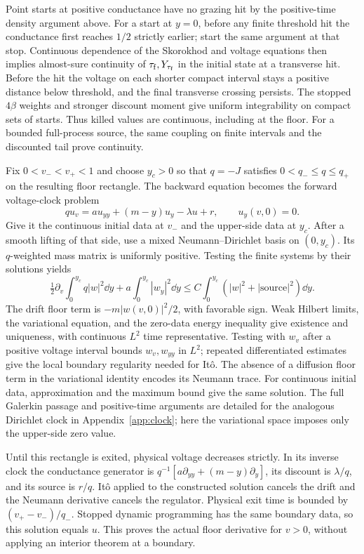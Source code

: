 Point starts at positive conductance have no grazing hit by the
positive-time density argument above. For a start at $y=0$,
before any finite threshold hit the conductance first reaches
$1/2$ strictly earlier; start the same argument at that stop.
Continuous dependence of the Skorokhod and voltage equations
then implies almost-sure continuity of ${\tau_{\mathrm f}},Y_{\tau_{\mathrm f}}$ in the
initial state at a transverse hit. Before the hit the voltage
on each shorter compact interval stays a positive distance
below threshold, and the final transverse crossing persists.
The stopped $4\beta$ weights and stronger discount moment give
uniform integrability on compact sets of starts. Thus killed
values are continuous, including at the floor. For a bounded
full-process source, the same coupling on finite intervals
and the discounted tail prove continuity.

Fix $0<v_-<v_+<1$ and choose $y_c>0$ so that $q=-J$ satisfies
$0<q_-\le q\le q_+$ on the resulting floor rectangle.
The backward equation becomes the forward voltage-clock problem
\begin{equation}\label{eq:floor-clock}
 q u_v=au_{yy}+(m-y)u_y-\lambda u+r,\qquad
 u_y(v,0)=0 .
\end{equation}
Give it the continuous initial data at $v_-$ and the upper-side
data at $y_c$. After a smooth lifting of that side, use a mixed
Neumann--Dirichlet basis on $(0,y_c)$. Its $q$-weighted mass
matrix is uniformly positive. Testing the finite systems by
their solutions yields
\[
 \tfrac12\partial_v\int_0^{y_c}q|w|^2\dd y
        +a\int_0^{y_c}|w_y|^2\dd y
 \le C\int_0^{y_c}(|w|^2+|\text{source}|^2)\dd y .
\]
The drift floor term is $-m|w(v,0)|^2/2$, with favorable sign.
Weak Hilbert limits, the variational equation, and the
zero-data energy inequality give existence and uniqueness,
with continuous $L^2$ time representative. Testing with $w_v$
after a positive voltage interval bounds $w_v,w_{yy}$ in $L^2$;
repeated differentiated estimates give the local boundary
regularity needed for It\^o. The absence of a diffusion floor
term in the variational identity encodes its Neumann trace.
For continuous initial data, approximation and the maximum
bound give the same solution. The full Galerkin passage and
positive-time arguments are detailed for the analogous
Dirichlet clock in Appendix~\ref{app:clock}; here the variational
space imposes only the upper-side zero value.

Until this rectangle is exited, physical voltage decreases
strictly. In its inverse clock the conductance generator is
$q^{-1}[a\partial_{yy}+(m-y)\partial_y]$, its discount is
$\lambda/q$, and its source is $r/q$. It\^o applied to the
constructed solution cancels the drift and the Neumann
derivative cancels the regulator. Physical exit time is
bounded by $(v_+-v_-)/q_-$. Stopped dynamic programming has
the same boundary data, so this solution equals $u$.
This proves the actual floor derivative for $v>0$, without
applying an interior theorem at a boundary.

